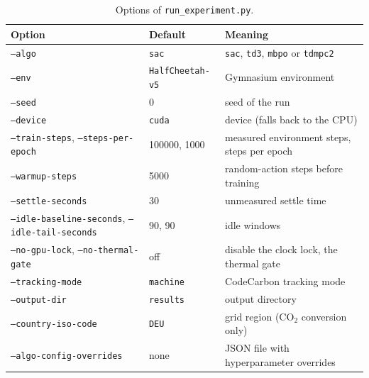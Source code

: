 \begin{table}[tbp]
  \centering
  \footnotesize
  \caption{Options of \texttt{run\_\allowbreak experiment.py}.}
  \label{tab:app-repro-cli}
  \begin{tabular}{@{}lll@{}}
    \toprule
    Option                                                          & Default            & Meaning                                                 \\
    \midrule
    \texttt{--algo}                                                 & \texttt{sac}       & \texttt{sac}, \texttt{td3}, \texttt{mbpo} or \texttt{tdmpc2} \\
    \texttt{--env}                                                  & \texttt{HalfCheetah-v5} & Gymnasium environment                              \\
    \texttt{--seed}                                                 & \num{0}            & seed of the run                                         \\
    \texttt{--device}                                               & \texttt{cuda}      & device (falls back to the CPU)                          \\
    \texttt{--train-steps}, \texttt{--steps-per-epoch}              & \num{100000}, \num{1000} & measured environment steps, steps per epoch       \\
    \texttt{--warmup-steps}                                         & \num{5000}         & random-action steps before training                     \\
    \texttt{--settle-seconds}                                       & \num{30}           & unmeasured settle time                                  \\
    \texttt{--idle-baseline-seconds}, \texttt{--idle-tail-seconds}  & \num{90}, \num{90} & idle windows                                            \\
    \texttt{--no-gpu-lock}, \texttt{--no-thermal-gate}              & off                & disable the clock lock, the thermal gate                \\
    \texttt{--tracking-mode}                                        & \texttt{machine}   & CodeCarbon tracking mode                                \\
    \texttt{--output-dir}                                           & \texttt{results}   & output directory                                        \\
    \texttt{--country-iso-code}                                     & \texttt{DEU}       & grid region (CO$_2$ conversion only)                    \\
    \texttt{--algo-config-overrides}                                & none               & JSON file with hyperparameter overrides                 \\
    \bottomrule
  \end{tabular}
\end{table}

